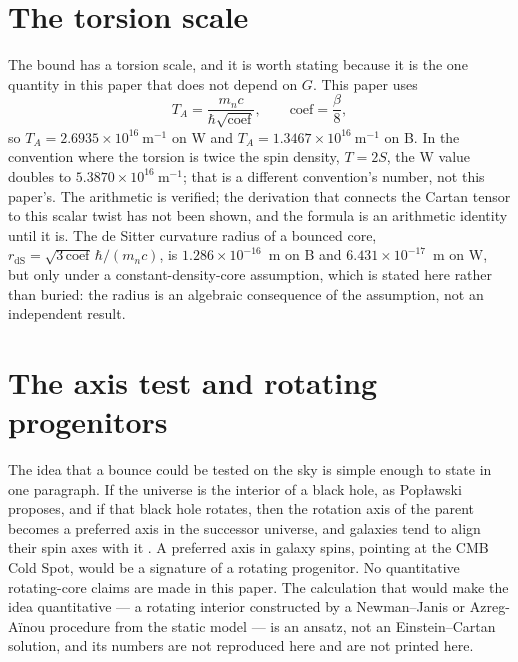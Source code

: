 \documentclass[11pt]{article}
\begin{document}
\section{The torsion scale}

The bound has a torsion scale, and it is worth stating because it is
the one quantity in this paper that does not depend on $G$. This paper
uses
\begin{equation}
T_A = \frac{m_n c}{\hbar\sqrt{\mathrm{coef}}},
\qquad \mathrm{coef} = \frac{\beta}{8},
\end{equation}
so $T_A = 2.6935\times10^{16}\ \mathrm{m^{-1}}$ on W and
$T_A = 1.3467\times10^{16}\ \mathrm{m^{-1}}$ on B. In the convention
where the torsion is twice the spin density, $T = 2S$, the W value
doubles to $5.3870\times10^{16}\ \mathrm{m^{-1}}$; that is a different
convention's number, not this paper's. The arithmetic is verified; the
derivation that connects the Cartan tensor to this scalar twist has not
been shown, and the formula is an arithmetic identity until it is. The
de Sitter curvature radius of a bounced core,
$r_{\mathrm{dS}} = \sqrt{3\,\mathrm{coef}}\,\hbar/(m_n c)$, is
$1.286\times10^{-16}$~m on B and $6.431\times10^{-17}$~m on W, but only
under a constant-density-core assumption, which is stated here rather
than buried: the radius is an algebraic consequence of the assumption,
not an independent result.

\section{The axis test and rotating progenitors}

The idea that a bounce could be tested on the sky is simple enough to
state in one paragraph. If the universe is the interior of a black hole,
as Pop{\l}awski proposes, and if that black hole rotates, then the
rotation axis of the parent becomes a preferred axis in the successor
universe, and galaxies tend to align their spin axes with it
\cite{Poplawski19}. A preferred axis in galaxy spins, pointing at the
CMB Cold Spot, would be a signature of a rotating progenitor. No
quantitative rotating-core claims are made in this paper. The
calculation that would make the idea quantitative --- a rotating
interior constructed by a Newman--Janis or Azreg-A\"inou procedure from
the static model --- is an ansatz, not an Einstein--Cartan solution, and
its numbers are not reproduced here and are not printed here.
\end{document}
